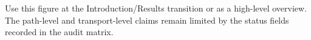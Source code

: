 Use this figure at the Introduction/Results transition or as a high-level overview. The path-level and transport-level claims remain limited by the status fields recorded in the audit matrix.
